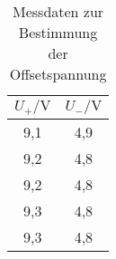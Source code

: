\begin{table}[h]
    \centering
    \caption{Messdaten zur Bestimmung der Offsetspannung}
    \label{tab:offsetspannung}
    \begin{tabular}{c c}
      \toprule
      $U_+/\si{\volt}$ & $U_-/\si{\volt}$ \\
      \midrule
      9,1&4,9\\
      9,2&4,8\\
      9,2&4,8\\
      9,3&4,8\\
      9,3&4,8\\
      \bottomrule
    \end{tabular}
  \end{table}
